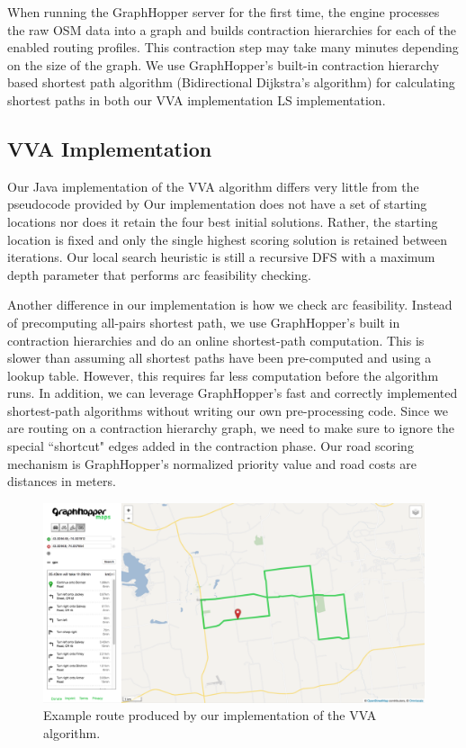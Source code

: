 \documentclass[honors]{union-cs-thesis}
\begin{document}
When running the GraphHopper server for the first time, the engine processes the raw OSM data into a graph and builds contraction hierarchies for each of the enabled routing profiles. This contraction step may take many minutes depending on the size of the graph. We use GraphHopper's built-in contraction hierarchy based shortest path algorithm (Bidirectional Dijkstra's algorithm) for calculating shortest paths in both our VVA implementation LS implementation.

\subsection{VVA Implementation}
Our Java implementation of the VVA algorithm differs very little from the pseudocode provided by \citeauthor{verbeeck2014extension} Our implementation does not have a set of starting locations nor does it retain the four best initial solutions. Rather, the starting location is fixed and only the single highest scoring solution is retained between iterations. Our local search heuristic is still a recursive DFS with a maximum depth parameter that performs arc feasibility checking.

Another difference in our implementation is how we check arc feasibility. Instead of precomputing all-pairs shortest path, we use GraphHopper's built in contraction hierarchies and do an online shortest-path computation. This is slower than assuming all shortest paths have been pre-computed and using a lookup table. However, this requires far less computation before the algorithm runs. In addition, we can leverage GraphHopper's fast and correctly implemented shortest-path algorithms without writing our own pre-processing code. Since we are routing on a contraction hierarchy graph, we need to make sure to ignore the special ``shortcut" edges added in the contraction phase. Our road scoring mechanism is GraphHopper's normalized priority value and road costs are distances in meters.

\begin{figure}
    \begin{center}
        \includegraphics[width=\textwidth]{figs/vva-route}
    \end{center}
    \caption{Example route produced by our implementation of the VVA algorithm.}
    \label{fig:vva-example}
\end{figure}
\end{document}
